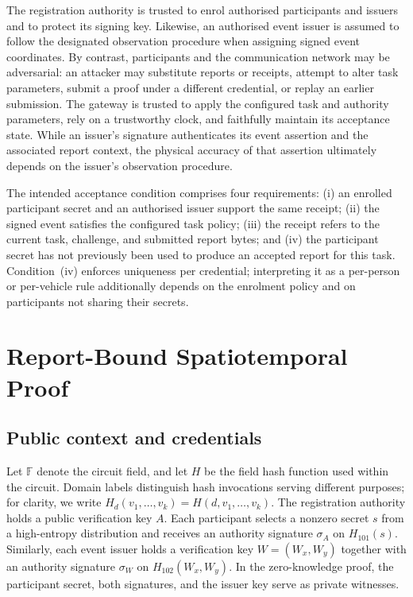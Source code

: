 \documentclass[pdflatex,iicol,sn-mathphys-num]{sn-jnl}
\begin{document}
The registration authority is trusted to enrol authorised participants and issuers and to protect its signing key. Likewise, an authorised event issuer is assumed to follow the designated observation procedure when assigning signed event coordinates. By contrast, participants and the communication network may be adversarial: an attacker may substitute reports or receipts, attempt to alter task parameters, submit a proof under a different credential, or replay an earlier submission. The gateway is trusted to apply the configured task and authority parameters, rely on a trustworthy clock, and faithfully maintain its acceptance state. While an issuer's signature authenticates its event assertion and the associated report context, the physical accuracy of that assertion ultimately depends on the issuer's observation procedure.

The intended acceptance condition comprises four requirements: (i) an enrolled participant secret and an authorised issuer support the same receipt; (ii) the signed event satisfies the configured task policy; (iii) the receipt refers to the current task, challenge, and submitted report bytes; and (iv) the participant secret has not previously been used to produce an accepted report for this task. Condition~(iv) enforces uniqueness per credential; interpreting it as a per-person or per-vehicle rule additionally depends on the enrolment policy and on participants not sharing their secrets.

\section{Report-Bound Spatiotemporal Proof}
\label{sec:protocol}

\subsection{Public context and credentials}
\label{sec:context}

Let $\mathbb F$ denote the circuit field, and let $H$ be the field hash function used within the circuit. Domain labels distinguish hash invocations serving different purposes; for clarity, we write $H_d(v_1,\ldots,v_k)=H(d,v_1,\ldots,v_k)$. The registration authority holds a public verification key $A$. Each participant selects a nonzero secret $s$ from a high-entropy distribution and receives an authority signature $\sigma_A$ on $H_{101}(s)$. Similarly, each event issuer holds a verification key $W=(W_x,W_y)$ together with an authority signature $\sigma_W$ on $H_{102}(W_x,W_y)$. In the zero-knowledge proof, the participant secret, both signatures, and the issuer key serve as private witnesses.
\end{document}
